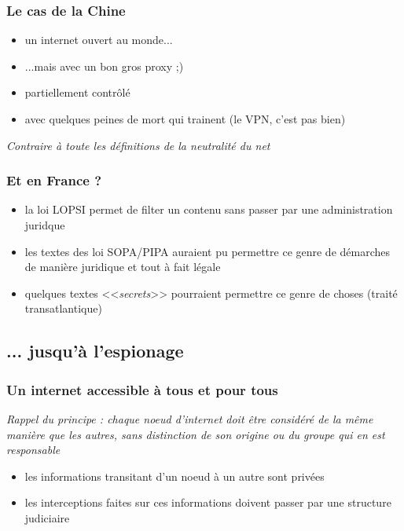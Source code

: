 \begin{frame}\frametitle{Le cas de la Chine}
    \begin{itemize}
        \item un internet ouvert au monde...
        \item ...mais avec un bon gros proxy ;)
        \item partiellement contrôlé
        \item avec quelques peines de mort qui trainent (le VPN, c'est pas bien)
    \end{itemize}

    \color{red}\emph{Contraire à toute les définitions de la neutralité du net}
\end{frame}


\begin{frame}\frametitle{Et en France ?}
    \begin{itemize}
        \item la loi \textsc{LOPSI} permet de filter un contenu sans passer
            par une administration juridque
        \item les textes des loi \textsc{SOPA/PIPA} auraient pu permettre ce
            genre de démarches de manière juridique et tout à fait légale
        \item quelques textes <<\emph{secrets}>> pourraient permettre ce genre
            de choses (traité transatlantique)
    \end{itemize}
\end{frame}


\subsection{... jusqu'à l'espionage}
\begin{frame}\frametitle{Un internet accessible à tous et pour tous}
    \emph{Rappel du principe : chaque noeud d'internet doit être considéré de
        la même manière que les autres, sans distinction de son origine ou du
    groupe qui en est responsable}

    \vspace{1em}

    \begin{itemize}
        \item les informations transitant d'un noeud à un autre sont privées
        \item les interceptions faites sur ces informations doivent passer par
            une structure judiciaire
    \end{itemize}
\end{frame}



